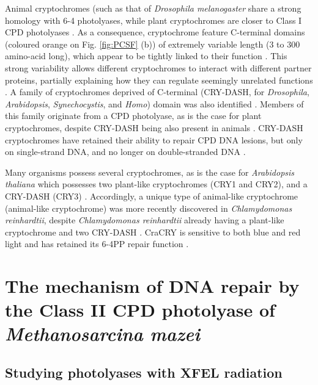 Animal cryptochromes (such as that of \textit{Drosophila melanogaster} share a strong homology with 6-4 photolyases, while plant cryptochromes are closer to Class I CPD photolyases \parencite{kavakliPhotolyaseCryptochromeFamily2017}. As a consequence, cryptochrome feature C-terminal domains (coloured orange on Fig. \ref{fig:PCSF} (b)) of extremely variable length (3 to 300 amino-acid long), which appear to be tightly linked to their function \parencite{partchRoleStructuralPlasticity2005}. This strong variability allows different cryptochromes to interact with different partner proteins, partially explaining how they can regulate seemingly unrelated functions \parencite{meiEvolutionaryHistoryPhotolyase2015}. A family of cryptochromes deprived of C-terminal (CRY-DASH, for \textit{Drosophila}, \textit{Arabidopsis}, \textit{Synechocystis}, and \textit{Homo}) domain was also identified \parencite{brudlerIdentificationNewCryptochrome2003}. Members of this family originate from a CPD photolyase, as is the case for plant cryptochromes, despite CRY-DASH being also present in animals \parencite{chavesCryptochromesBlueLight2011}. CRY-DASH cryptochromes have retained their ability to repair CPD DNA lesions, but only on single-strand DNA, and no longer on double-stranded DNA \parencite{selbyCryptochromePhotolyaseClass2006}. 

Many organisms possess several cryptochromes, as is the case for \textit{Arabidopsis thaliana} which possesses two plant-like cryptochromes (CRY1 and CRY2), and a CRY-DASH (CRY3) \parencite{kavakliPhotolyaseCryptochromeFamily2017}. Accordingly, a unique type of animal-like cryptochrome (animal-like cryptochrome) was more recently discovered in \textit{Chlamydomonas reinhardtii}, despite \textit{Chlamydomonas reinhardtii} already having a plant-like cryptochrome and two CRY-DASH \parencite{beelFlavinBindingCryptochrome2012}. CraCRY is sensitive to both blue and red light and has retained its 6-4PP repair function \parencite{franzStructureBifunctionalCryptochrome2018}. 

\chapter{The mechanism of DNA repair by the Class II CPD photolyase of \textit{Methanosarcina mazei}}\label{chap:MmCPDII}

\vspace{10mm}

\section{Studying photolyases with XFEL radiation}

